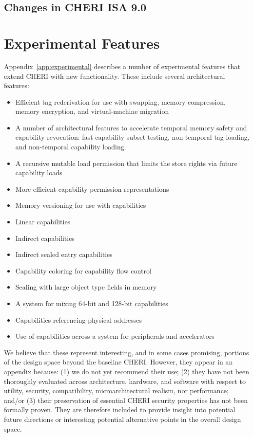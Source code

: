 \subsection{Changes in CHERI ISA 9.0}



\section{Experimental Features}
\label{sec:intro:experimental}


Appendix~\ref{app:experimental} describes a number of experimental features
that extend CHERI with new functionality.
These include several architectural features:

\begin{itemize}
\item Efficient tag rederivation for use with swapping, memory compression,
  memory encryption, and virtual-machine migration
\item A number of architectural features to accelerate temporal memory safety
  and capability revocation: fast capability subset testing, non-temporal
  tag loading, and non-temporal capability loading.
\item A recursive mutable load permission that limits the store rights
  via future capability loads
\item More efficient capability permission representations
\item Memory versioning for use with capabilities
\item Linear capabilities
\item Indirect capabilities
\item Indirect sealed entry capabilities
\item Capability coloring for capability flow control
\item Sealing with large object type fields in memory
\item A system for mixing 64-bit and 128-bit capabilities
\item Capabilities referencing physical addresses
\item Use of capabilities across a system for peripherals and accelerators
\end{itemize}

We believe that these represent interesting, and in some cases promising,
portions of the design space beyond the baseline CHERI.
However, they appear in an appendix because: (1) we do not yet recommend their
use; (2) they have not been thoroughly evaluated across architecture,
hardware, and software with respect to utility, security, compatibility,
microarchitectural realism, nor performance; and/or (3) their preservation of
essential CHERI security properties has not been formally proven.
They are therefore included to provide insight into potential future
directions or interesting potential alternative points in the overall design
space.

